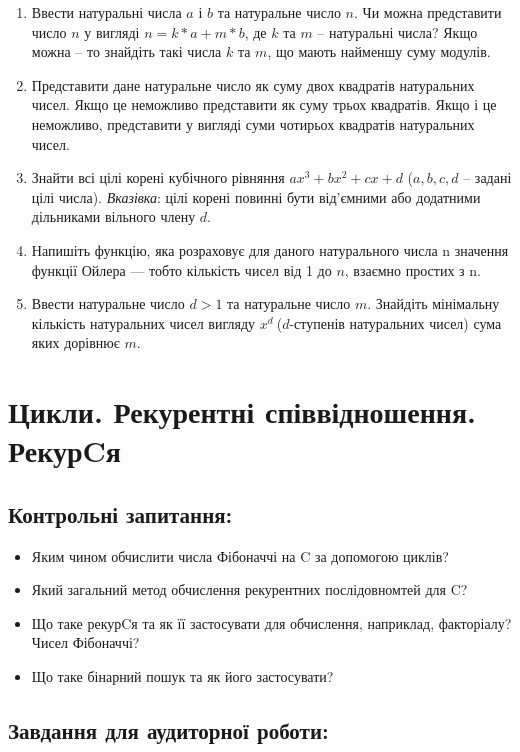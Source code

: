 \documentclass[a5paper,titlepage,openany,twoside,draft]{book_unv}%
\begin{document}
\begin{enumerate}
\def\labelenumi{\arabic{enumi})}
\setcounter{enumi}{26}
\item
  Ввести натуральні числа $a$ і $b$ та натуральне число $n$. Чи можна
  представити число $n$ у вигляді $n= k*a + m*b$, де $k$ та $m$ -- натуральні
  числа? Якщо можна -- то знайдіть такі числа $k$ та $m$, що мають найменшу
  суму модулів.
\item
  Представити дане натуральне число як суму двох квадратів натуральних
  чисел. Якщо це неможливо представити як суму трьох квадратів. Якщо і
  це неможливо, представити у вигляді суми чотирьох квадратів
  натуральних чисел.
\item
  Знайти всі цілі корені кубічного рівняння $ax^3 + bx^2 + cx + d$ ($a,b,c,d$ 
-- задані цілі числа). \emph{Вказівка}: цілі корені повинні бути від'ємними
 або додатними дільниками вільного члену $d$.
\item
  Напишіть функцію, яка розраховує для даного натурального числа n
  значення функції Ойлера --- тобто кількість чисел від 1 до $n$, взаємно простих з
  n.
\item
  Ввести натуральне число \(d > 1\) та натуральне число $m$. Знайдіть
  мінімальну кількість натуральних чисел вигляду \(x^{d}\ \)(\(d\)-ступенів
  натуральних чисел) сума яких дорівнює $m$.
\end{enumerate}


\chapter{Цикли. Рекурентні співвідношення. РекурCя }
%

\section{Контрольні запитання:}
\begin{itemize}
\item
  Яким чином обчислити числа Фібоначчі на C за допомогою циклів?
\item
  Який загальний метод обчислення рекурентних послідовномтей для C?
\item
  Що таке рекурCя та як її застосувати для обчислення, наприклад,
  факторіалу? Чисел Фібоначчі?
\item
  Що таке бінарний пошук та як його застосувати?
\end{itemize}

\section{Завдання для аудиторної роботи:}
\end{document}
